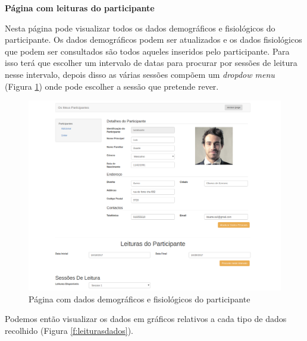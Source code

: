 \par
\textbf{Página com leituras do participante}
\par
Nesta página pode visualizar todos os dados demográficos e fisiológicos do participante. Os dados demográficos podem ser atualizados e os dados fisiológicos que podem ser consultados são todos aqueles inseridos pelo participante. Para isso terá que escolher um intervalo de datas para procurar por sessões de leitura nesse intervalo, depois disso as várias sessões compõem um \textit{dropdow menu} (Figura \ref{f:webleiturassessoes}) onde pode escolher a sessão que pretende rever. 

\begin{figure}[H]
\centering
\includegraphics[width=1\textwidth]{imgs/user-info-web.png}
\caption[Página com dados demográficos e fisiológicos do participante]{Página com dados demográficos e fisiológicos do participante}
\label{f:webleiturassessoes}
\end{figure}

Podemos então visualizar os dados em gráficos relativos a cada tipo de dados recolhido (Figura \ref{f:leiturasdados}). 

